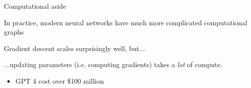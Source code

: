 \begin{frame}[t]{Computational aside}

	In practice, modern neural networks have much more complicated computational graphs

	\pause


	\pause \vspace{1in}

	Gradient descent scales surprisingly well, but...

	\pause \medskip

	...updating parameters (i.e. computing gradients) takes a \textit{lot} of compute.

	\pause \smallskip

	\begin{itemize}
		\item GPT 4 cost over \$100 million
	\end{itemize}
\end{frame}

